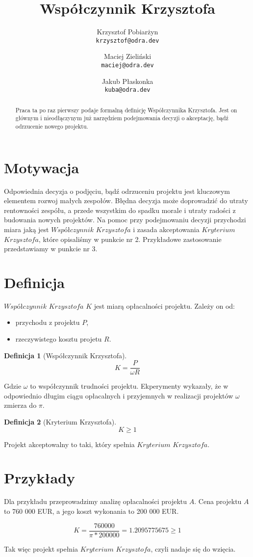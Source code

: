 \documentclass{article}
\title{Współczynnik Krzysztofa}
\author{
  Krzysztof Pobiarżyn\\
  \texttt{krzysztof@odra.dev}
  \and
  Maciej Zieliński\\
  \texttt{maciej@odra.dev}
  \and
  Jakub Płaskonka\\
  \texttt{kuba@odra.dev}
}
\theoremstyle{definition}
\newtheorem{definition}{Definicja}[section]
\begin{document}
\maketitle

\begin{abstract}
Praca ta po raz pierwszy podaje formalną definicję Współczynnika Krzysztofa. Jest on głównym i nieodłączynym już narzędziem podejmowania decyzji o akceptację, bądź odrzucenie nowego projektu.
\end{abstract}

\section{Motywacja}
Odpowiednia decyzja o podjęciu, bądź odrzuceniu projektu jest kluczowym elementem rozwoj małych zespołów. Błędna decyzja może doprowadzić do utraty rentowności zespółu, a przede wszystkim do spadku morale i utraty radości z budowania nowych projektów. Na pomoc przy podejmowaniu decyzji przychodzi miara jaką jest $ Współczynnik$ $Krzysztofa$ i zasada akceptowania $Kryterium$ $Krzysztofa$, które opisaliśmy w punkcie nr 2. Przykładowe zastosowanie przedstawiamy w punkcie nr 3. 

\section{Definicja}

$Współczynnik$ $Krzysztofa$ $K$ jest miarą opłacalności projektu. Zależy on od:

\begin{itemize}
\item przychodu z projektu $P$,
\item rzeczywistego kosztu projetu $R$.
\end{itemize}

\begin{definition}[Współczynnik Krzysztofa]
\[K = \frac{P}{\omega R}\]
\end{definition}

Gdzie $\omega$ to współczynnik trudności projektu.
Ekperymenty wykazały, że w odpowiednio długim ciągu opłacalnych i przyjemnych w realizacji projektów $\omega$ zmierza do $\pi$.

\begin{definition}[Kryterium Krzysztofa]
\[K \ge 1\]
\end{definition}

Projekt akceptowalny to taki, który spełnia $Kryterium$ $Krzysztofa$.

\section{Przykłady}
Dla przykładu przeprowadzimy analizę opłacalności projektu $A$. Cena projektu $A$ to 760 000 EUR, a jego koszt wykonania to 200 000 EUR.

\[K = \frac{760000}{\pi * 200000} = 1.2095775675 \ge 1\]

Tak więc projekt spełnia $Kryterium$ $Krzysztofa$, czyli nadaje się do wzięcia.
\end{document}
